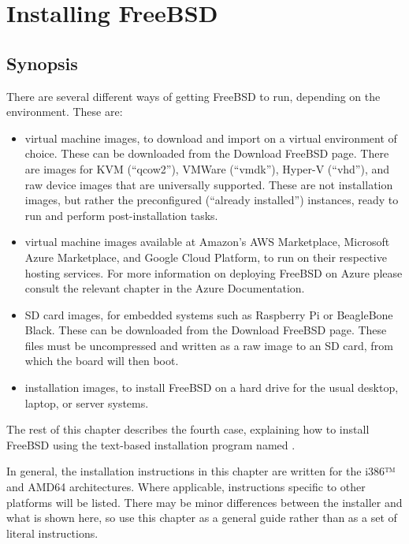 \chapter{Installing FreeBSD}

\section{Synopsis}

There are several different ways of getting FreeBSD to run, depending on the environment.
These are:
\begin{itemize}
\item
   virtual machine images, to download and import on a virtual environment of choice.
   These can be downloaded from the Download FreeBSD page.
   There are images for KVM (``qcow2''), VMWare (``vmdk''), Hyper-V (``vhd''), and raw device images that are universally supported.
    These are not installation images, but rather the preconfigured (``already installed'') instances, ready to run and perform post-installation tasks.
\item
   virtual machine images available at Amazon's AWS Marketplace, Microsoft Azure Marketplace, and Google Cloud Platform, to run on their respective hosting services.
   For more information on deploying FreeBSD on Azure please consult the relevant chapter in the Azure Documentation.
\item
   SD card images, for embedded systems such as Raspberry Pi or BeagleBone Black.
   These can be downloaded from the Download FreeBSD page.
   These files must be uncompressed and written as a raw image to an SD card, from which the board will then boot.
\item
   installation images, to install FreeBSD on a hard drive for the usual desktop, laptop, or server systems.
\end{itemize}
The rest of this chapter describes the fourth case, explaining how to install FreeBSD using the text-based installation program named .

In general, the installation instructions in this chapter are written for the i386™ and AMD64 architectures.
Where applicable, instructions specific to other platforms will be listed.
There may be minor differences between the installer and what is shown here, so use this chapter as a general guide rather than as a set of literal instructions.

